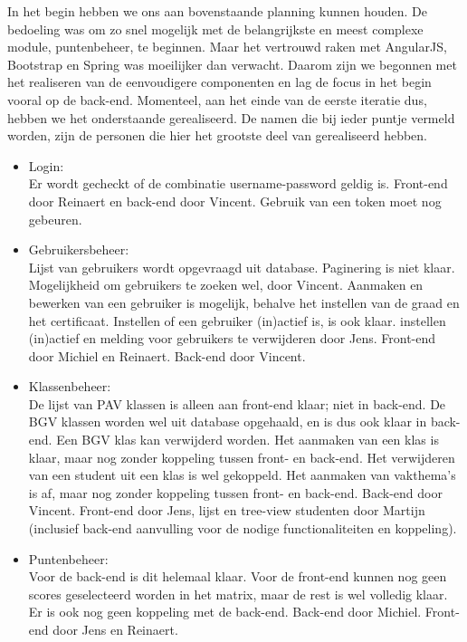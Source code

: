 \documentclass[a4paper]{article}
\begin{document}
In het begin hebben we ons aan bovenstaande planning kunnen houden. De bedoeling was om zo snel mogelijk met de belangrijkste en meest complexe module, puntenbeheer, te beginnen. Maar het vertrouwd raken met AngularJS, Bootstrap en Spring was moeilijker dan verwacht. Daarom zijn we begonnen met het realiseren van de eenvoudigere componenten en lag de focus in het begin vooral op de back-end. Momenteel, aan het einde van de eerste iteratie dus, hebben we het onderstaande gerealiseerd. De namen die bij ieder puntje vermeld worden, zijn de personen die hier het grootste deel van gerealiseerd hebben.

\begin{itemize}
    \item Login:\\
    Er wordt gecheckt of de combinatie username-password geldig is. Front-end door Reinaert en back-end door Vincent. Gebruik van een token moet nog gebeuren.
    
    \item Gebruikersbeheer:\\
    Lijst van gebruikers wordt opgevraagd uit database. Paginering is niet klaar. Mogelijkheid om gebruikers te zoeken wel, door Vincent. Aanmaken en bewerken van een gebruiker is mogelijk, behalve het instellen van de graad en het certificaat. Instellen of een gebruiker (in)actief is, is ook klaar. instellen (in)actief en melding voor gebruikers te verwijderen door Jens. Front-end door Michiel en Reinaert. Back-end door Vincent. 
    
    \item Klassenbeheer:\\
    De lijst van PAV klassen is alleen aan front-end klaar; niet in back-end. De BGV klassen worden wel uit database opgehaald, en is dus ook klaar in back-end. Een BGV klas kan verwijderd worden. Het aanmaken van een klas is klaar, maar nog zonder koppeling tussen front- en back-end. Het verwijderen van een student uit een klas is wel gekoppeld. Het aanmaken van vakthema's is af, maar nog zonder koppeling tussen front- en back-end. Back-end door Vincent. Front-end door Jens, lijst en tree-view studenten door Martijn (inclusief back-end aanvulling voor de nodige functionaliteiten en koppeling). 
    
    \item Puntenbeheer:\\
    Voor de back-end is dit helemaal klaar. Voor de front-end kunnen nog geen scores geselecteerd worden in het matrix, maar de rest is wel volledig klaar. Er is ook nog geen koppeling met de back-end. Back-end door Michiel. Front-end door Jens en Reinaert. 
    

\end{itemize}
\end{document}
